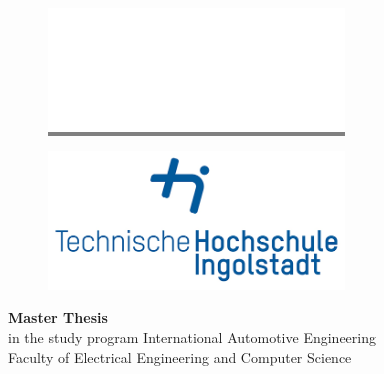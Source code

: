

\begin{titlepage}	
\begin{figure}
      \begin{minipage}[t]{0.4\textwidth}
        \begin{flushleft}
        \colorbox{gray}{\includegraphics[width=0.7\textwidth]{images/CES_LOGO_1C_White_normal.png}}
        \end{flushleft}
      \end{minipage}
      \hfill
      \begin{minipage}[t]{0.4\textwidth}
        \begin{flushright}
        \includegraphics[width=0.7\textwidth]{images/thiRGB.jpg}
        \end{flushright}
      \end{minipage}
    \end{figure}
	
	\begin{center}
		\hrulefill 
	\end{center}
	
	
	\begin{center}	
		\vspace{1cm}
		
		\huge\textbf{
			Master Thesis}\\[2.5cm]
		\large
			in the study program International Automotive Engineering\\ Faculty of Electrical Engineering and Computer Science	\\ [7em]
	

\end{center}
\end{titlepage}
